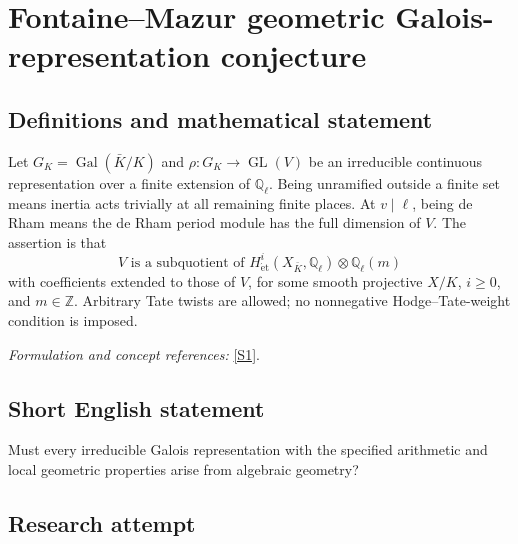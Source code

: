 \documentclass[11pt,a4paper]{article}
\newcommand{\Z}{\mathbb{Z}}
\newcommand{\Q}{\mathbb{Q}}
\newcommand{\sref}[2]{\hyperlink{source:#1:#2}{[S#2]}}
\newif\ifshowcatalogue
\newcommand{\cataloguescope}[1]{\ifshowcatalogue
 \paragraph{Exact scope in the supplied catalogue.}
 \begin{quote}\small #1\end{quote}\fi}
\numberwithin{equation}{section}
\begin{document}
\setcounter{section}{0}
\clearpage
\section*{\texorpdfstring{Fontaine–Mazur geometric Galois-representation conjecture}{Fontaine–Mazur geometric Galois-representation conjecture}}\label{statement}
\subsection{Definitions and mathematical statement}
Let $G_K=\operatorname{Gal}(\bar K/K)$ and $\rho:G_K\to\operatorname{GL}(V)$ be an irreducible continuous representation over a finite extension of $\Q_\ell$. Being unramified outside a finite set means inertia acts trivially at all remaining finite places. At $v\mid\ell$, being de Rham means the de Rham period module has the full dimension of $V$. The assertion is that
\[
 V\text{ is a subquotient of }H^i_{\mathrm{\acute et}}(X_{\bar K},\Q_\ell)\otimes\Q_\ell(m)
\]
with coefficients extended to those of $V$, for some smooth projective $X/K$, $i\ge0$, and $m\in\Z$. Arbitrary Tate twists are allowed; no nonnegative Hodge--Tate-weight condition is imposed.
\par\smallskip\textit{Formulation and concept references:} \sref{statement}{1}.
\cataloguescope{Let K be a number field and l a prime. Every irreducible continuous finite-dimensional l-adic representation rho of Gal(Kbar/K), unramified outside finitely many places and de Rham at every place above l, occurs as a subquotient of H\textasciicircum{}i\_et(X\_Kbar)(m) for some smooth projective variety X over K, integer i >= 0, and integer Tate twist m. Etale cohomology is taken with the same l-adic coefficient field as rho. There is no nonnegative Hodge-Tate weight restriction.}
\subsection{Short English statement}
Must every irreducible Galois representation with the specified arithmetic and local geometric properties arise from algebraic geometry?
\subsection{Research attempt}
\end{document}
